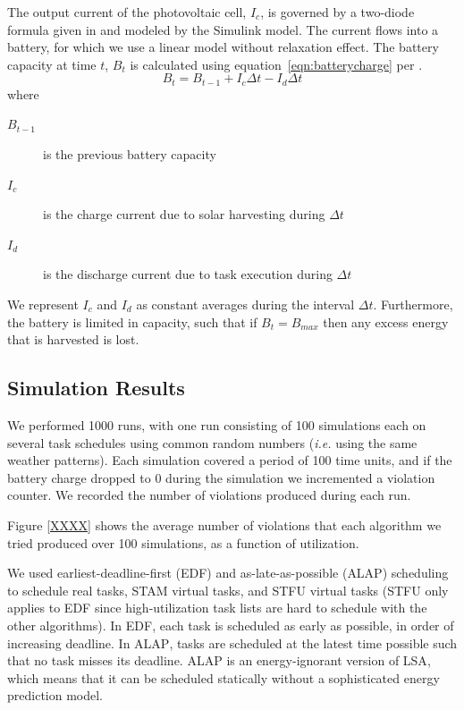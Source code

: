 The output current of the photovoltaic cell, $I_c$, is governed by a two-diode formula given in \cite{marwali1997probabilistic} and modeled by the Simulink model.  The current flows into a battery, for which we use a linear model without relaxation effect.  The battery capacity at time $t$, $B_t$ is calculated using equation~\ref{eqn:batterycharge} per \cite{niyato2007sleep}.
\begin{equation}
 B_t = B_{t-1} + I_c \Delta t - I_d \Delta t
\label{eqn:batterycharge}
\end{equation}
where 
\begin{description}
\item[$B_{t-1}$] is the previous battery capacity
\item[$I_c$] is the charge current due to solar harvesting during $\Delta t$
\item[$I_d$] is the discharge current due to task execution during $\Delta t$
\end{description}
We represent $I_c$ and $I_d$  as constant averages during the interval $\Delta t$. Furthermore, the battery is
limited in capacity, such that if $B_t = B_{max}$ then any excess energy that is harvested is lost.

\subsection{Simulation Results}
We performed 1000 runs, with one run consisting of 100 simulations each on several task schedules using common random numbers (\emph{i.e.} using the same weather patterns).  Each simulation covered a period of 100 time units, and if the battery charge dropped to 0 during the simulation we incremented a violation counter.  We recorded the number of violations produced during each run.  

Figure \ref{XXXX} shows the average number of violations that each algorithm we tried produced over 100 simulations, as a function of utilization.

We used earliest-deadline-first (\textsc{EDF}) and as-late-as-possible (\textsc{ALAP}) scheduling to schedule real tasks, \textsc{STAM} virtual tasks, and \textsc{STFU} virtual tasks (\textsc{STFU} only applies to \textsc{EDF} since high-utilization task lists are hard to schedule with the other algorithms).  In \textsc{EDF}, each task is scheduled as early as possible, in order of increasing deadline.  In \textsc{ALAP}, tasks are scheduled at the latest time possible such that no task misses its deadline.  \textsc{ALAP} is an energy-ignorant version of \textsc{LSA}, which means that it can be scheduled statically without a sophisticated energy prediction model.  

